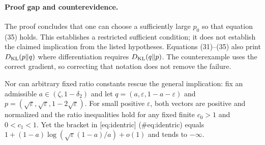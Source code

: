 \documentclass[10pt]{article}
\begin{document}
\paragraph*{Proof gap and counterevidence.}\mbox{}\par
The proof concludes that one can choose a sufficiently large \(p_0\) so that equation (35) holds. This establishes a restricted sufficient condition; it does not establish the claimed implication from the listed hypotheses. Equations (31)–(35) also print \(D_{\rm KL}(p\|q)\) where differentiation requires \(D_{\rm KL}(q\|p)\). The counterexample uses the correct gradient, so correcting that notation does not remove the failure.\par
Nor can arbitrary fixed ratio constants rescue the general implication: fix an admissible \(a\in(\zeta,1-\delta_2)\) and let \(q=(a,\varepsilon,1-a-\varepsilon)\) and \(p=(\sqrt{\varepsilon},\sqrt{\varepsilon},1-2\sqrt{\varepsilon})\). For small positive \(\varepsilon\), both vectors are positive and normalized and the ratio inequalities hold for any fixed finite \(c_0>1\) and \(0<c_1<1\). Yet the bracket in [eq:identric] (\#eq:identric) equals \(1+(1-a)\log(\sqrt{\varepsilon}(1-a)/a)+o(1)\) and tends to \(-\infty\).\par
\end{document}
